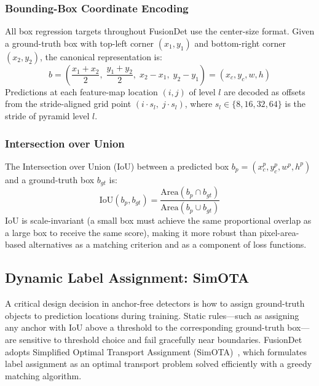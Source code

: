 
\subsubsection{Bounding-Box Coordinate Encoding}

All box regression targets throughout FusionDet use the
center-size format.  Given a ground-truth box with top-left
corner $(x_1, y_1)$ and bottom-right corner $(x_2, y_2)$, the
canonical representation is:
\begin{equation}
    b = \left(
        \frac{x_1 + x_2}{2},\;
        \frac{y_1 + y_2}{2},\;
        x_2 - x_1,\;
        y_2 - y_1
    \right)
    = (x_c, y_c, w, h)
    \label{eq:bbox}
\end{equation}
Predictions at each feature-map location $(i, j)$ of level
$l$ are decoded as offsets from the stride-aligned grid point
$\left(i \cdot s_l,\; j \cdot s_l\right)$, where $s_l \in
\{8, 16, 32, 64\}$ is the stride of pyramid level $l$.

\subsubsection{Intersection over Union}

The Intersection over Union (IoU) between a predicted box
$b_p = (x_c^p, y_c^p, w^p, h^p)$ and a ground-truth box
$b_{gt}$ is:
\begin{equation}
    \text{IoU}(b_p, b_{gt}) =
    \frac{\text{Area}(b_p \cap b_{gt})}
         {\text{Area}(b_p \cup b_{gt})}
    \label{eq:iou}
\end{equation}
IoU is scale-invariant (a small box must achieve the same
proportional overlap as a large box to receive the same score),
making it more robust than pixel-area-based alternatives as a
matching criterion and as a component of loss functions.

\subsection{Dynamic Label Assignment: SimOTA}

A critical design decision in anchor-free detectors is how to
assign ground-truth objects to prediction locations during
training.  Static rules---such as assigning any anchor with
IoU above a threshold to the corresponding ground-truth box---
are sensitive to threshold choice and fail gracefully near
boundaries.  FusionDet adopts Simplified Optimal Transport
Assignment (SimOTA)~\cite{ge2021yolox}, which formulates label
assignment as an optimal transport problem solved efficiently
with a greedy matching algorithm.

